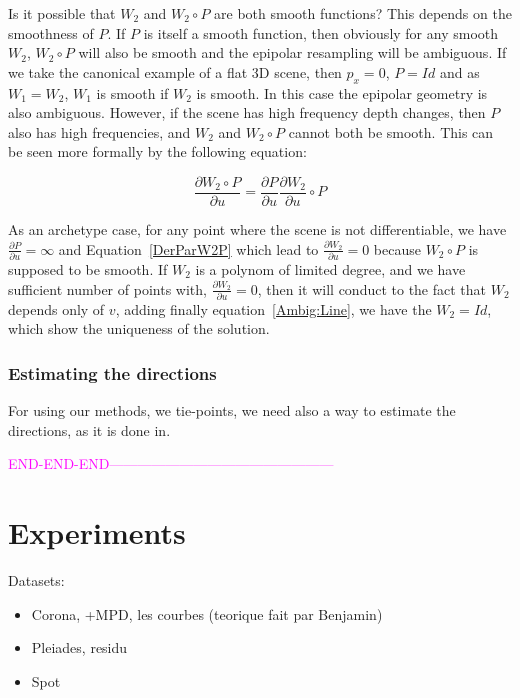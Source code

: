 \documentclass{ipol}
\newcommand{\DerPart}[2]{\frac{\partial #1}{\partial #2}}
\newcommand{\ENDCHANGE}{\textcolor{magenta} {END-END-END------------------------------------------------}}
\begin{document}
Is it possible that $W_2$ and $W_2 \circ P$ are both smooth functions? This depends on the smoothness of $P$.
%
If $P$ is itself a smooth function, then obviously for any smooth $W_2$,  $W_2 \circ P$  will
also be smooth and the epipolar resampling will be ambiguous. If we take the canonical example of a flat 3D scene, then $p_x=0$,  $P=Id$ and as $W_1=W_2$, $W_1$ is smooth if $W_2$ is smooth. 
In this case the epipolar geometry is also ambiguous.
%
However, if the scene has high frequency depth changes, then $P$ also has high frequencies,
and  $W_2$ and $W_2 \circ P$ cannot both be smooth. This can be seen more formally
by the following equation:

\begin{equation}
   \DerPart{W_2 \circ P}{u} = \DerPart{P}{u} \DerPart{W_2} {u} \circ P  \label{DerParW2P}
\end{equation}

{As an archetype case, for any point where the scene is not differentiable,
we have $ \DerPart{P}{u}= \infty$ and Equation~\eqref{DerParW2P} which lead to $ \DerPart{W_2} {u}=0$
because $W_2 \circ P$ is supposed to be smooth.
If $W_2$ is a polynom of limited degree, and we have sufficient number of points with, $ \DerPart{W_2} {u}=0$,
then it will conduct to the fact that $W_2$ depends only of $v$, adding finally equation~\eqref{Ambig:Line},
we have the $W_2=Id$, which show the uniqueness of  the solution.
}


\subsubsection{Estimating the directions}

For using our methods, we tie-points, we need also a way to estimate the directions, 
as it is done in.


\ENDCHANGE{}






\section{Experiments}\label{sec:experiments}

Datasets:
\begin{itemize}
\item Corona, +MPD, les courbes (teorique fait par Benjamin)
\item Pleiades, residu 
\item Spot
\end{itemize}
\end{document}
